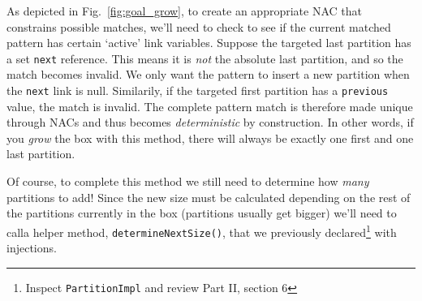 As depicted in Fig.~\ref{fig:goal_grow}, to create an appropriate \mbox{NAC} that constrains possible matches, we'll need to check to see if the current matched
pattern has certain `active' link variables. Suppose the targeted last partition has a set \texttt{next} reference. This means it is \emph{not} the absolute
last partition, and so the match becomes invalid. We only want the pattern to insert a new partition when the \texttt{next} link is null. Similarily, if the
targeted first partition has a \texttt{previous} value, the match is invalid. The complete pattern match is therefore made unique through NACs and thus becomes
\emph{deterministic} by construction. In other words, if you \emph{grow} the box with this method, there will always be exactly one first and one last
partition.

Of course, to complete this method we still need to determine how \emph{many} partitions to add! Since the new size must be calculated depending on the rest of
the partitions currently in the box (partitions usually get bigger) we'll need to calla helper method, \texttt{determineNextSize()}, that we previously
declared\footnote{Inspect \texttt{PartitionImpl} and review Part II, section 6} with injections.





